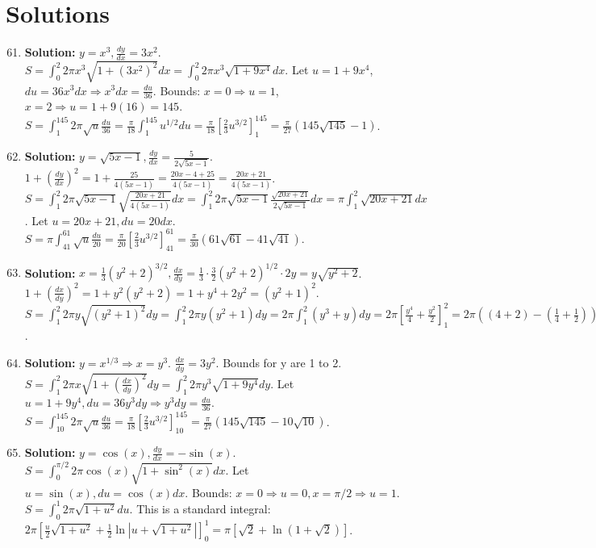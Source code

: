 \documentclass{article}
\begin{document}
\section*{Solutions}
\begin{enumerate}
    \setcounter{enumi}{60}
\item \textbf{Solution:} $y=x^3, \frac{dy}{dx}=3x^2$. $S = \int_0^2 2\pi x^3 \sqrt{1+(3x^2)^2} dx = \int_0^2 2\pi x^3 \sqrt{1+9x^4} dx$.
Let $u=1+9x^4$, $du=36x^3 dx \Rightarrow x^3 dx = \frac{du}{36}$.
Bounds: $x=0 \Rightarrow u=1$, $x=2 \Rightarrow u=1+9(16)=145$.
$S = \int_1^{145} 2\pi \sqrt{u} \frac{du}{36} = \frac{\pi}{18} \int_1^{145} u^{1/2} du = \frac{\pi}{18} \left[\frac{2}{3}u^{3/2}\right]_1^{145} = \frac{\pi}{27}(145\sqrt{145}-1)$.

\item \textbf{Solution:} $y=\sqrt{5x-1}, \frac{dy}{dx}=\frac{5}{2\sqrt{5x-1}}$. $1+(\frac{dy}{dx})^2 = 1+\frac{25}{4(5x-1)} = \frac{20x-4+25}{4(5x-1)} = \frac{20x+21}{4(5x-1)}$.
$S = \int_1^2 2\pi \sqrt{5x-1} \sqrt{\frac{20x+21}{4(5x-1)}} dx = \int_1^2 2\pi \sqrt{5x-1} \frac{\sqrt{20x+21}}{2\sqrt{5x-1}} dx = \pi \int_1^2 \sqrt{20x+21} dx$.
Let $u=20x+21, du=20dx$. $S = \pi \int_{41}^{61} \sqrt{u} \frac{du}{20} = \frac{\pi}{20} \left[\frac{2}{3}u^{3/2}\right]_{41}^{61} = \frac{\pi}{30}(61\sqrt{61}-41\sqrt{41})$.

\item \textbf{Solution:} $x=\frac{1}{3}(y^2+2)^{3/2}, \frac{dx}{dy}=\frac{1}{3} \cdot \frac{3}{2}(y^2+2)^{1/2} \cdot 2y = y\sqrt{y^2+2}$.
$1+(\frac{dx}{dy})^2 = 1+y^2(y^2+2) = 1+y^4+2y^2 = (y^2+1)^2$.
$S = \int_1^2 2\pi y \sqrt{(y^2+1)^2} dy = \int_1^2 2\pi y(y^2+1) dy = 2\pi \int_1^2 (y^3+y) dy = 2\pi \left[\frac{y^4}{4}+\frac{y^2}{2}\right]_1^2 = 2\pi \left( (4+2) - (\frac{1}{4}+\frac{1}{2}) \right) = 2\pi(6-\frac{3}{4}) = \frac{21\pi}{2}$.

\item \textbf{Solution:} $y=x^{1/3} \Rightarrow x=y^3$. $\frac{dx}{dy}=3y^2$. Bounds for y are 1 to 2.
$S = \int_1^2 2\pi x \sqrt{1+(\frac{dx}{dy})^2} dy = \int_1^2 2\pi y^3 \sqrt{1+9y^4} dy$.
Let $u=1+9y^4, du=36y^3 dy \Rightarrow y^3 dy = \frac{du}{36}$.
$S = \int_{10}^{145} 2\pi \sqrt{u} \frac{du}{36} = \frac{\pi}{18} \left[\frac{2}{3}u^{3/2}\right]_{10}^{145} = \frac{\pi}{27}(145\sqrt{145}-10\sqrt{10})$.

\item \textbf{Solution:} $y=\cos(x), \frac{dy}{dx}=-\sin(x)$. $S = \int_0^{\pi/2} 2\pi \cos(x) \sqrt{1+\sin^2(x)} dx$.
Let $u=\sin(x), du=\cos(x) dx$. Bounds: $x=0 \Rightarrow u=0, x=\pi/2 \Rightarrow u=1$.
$S = \int_0^1 2\pi \sqrt{1+u^2} du$. This is a standard integral: $2\pi \left[\frac{u}{2}\sqrt{1+u^2} + \frac{1}{2}\ln|u+\sqrt{1+u^2}|\right]_0^1 = \pi[\sqrt{2}+\ln(1+\sqrt{2})]$.


\end{enumerate}
\end{document}
